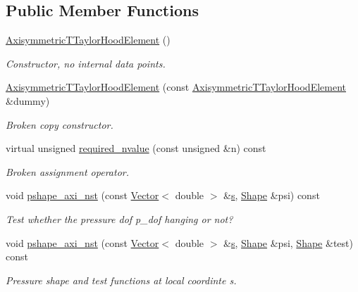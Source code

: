 \subsection*{Public Member Functions}
\begin{DoxyCompactItemize}
\item 
\hyperlink{classoomph_1_1AxisymmetricTTaylorHoodElement_a0c37daf4d618fad20746a0df0bc0d150}{Axisymmetric\+T\+Taylor\+Hood\+Element} ()
\begin{DoxyCompactList}\small\item\em Constructor, no internal data points. \end{DoxyCompactList}\item 
\hyperlink{classoomph_1_1AxisymmetricTTaylorHoodElement_a629d1c0d1397f3804f99f97119dd6289}{Axisymmetric\+T\+Taylor\+Hood\+Element} (const \hyperlink{classoomph_1_1AxisymmetricTTaylorHoodElement}{Axisymmetric\+T\+Taylor\+Hood\+Element} \&dummy)
\begin{DoxyCompactList}\small\item\em Broken copy constructor. \end{DoxyCompactList}\item 
virtual unsigned \hyperlink{classoomph_1_1AxisymmetricTTaylorHoodElement_a6a5dd6b252f98c37d896a3d6f35d3688}{required\+\_\+nvalue} (const unsigned \&n) const
\begin{DoxyCompactList}\small\item\em Broken assignment operator. \end{DoxyCompactList}\item 
void \hyperlink{classoomph_1_1AxisymmetricTTaylorHoodElement_a9a52e3c13681e0ad373b330a0934b7a1}{pshape\+\_\+axi\+\_\+nst} (const \hyperlink{classoomph_1_1Vector}{Vector}$<$ double $>$ \&\hyperlink{cfortran_8h_ab7123126e4885ef647dd9c6e3807a21c}{s}, \hyperlink{classoomph_1_1Shape}{Shape} \&psi) const
\begin{DoxyCompactList}\small\item\em Test whether the pressure dof p\+\_\+dof hanging or not? \end{DoxyCompactList}\item 
void \hyperlink{classoomph_1_1AxisymmetricTTaylorHoodElement_acaeacbb982949d5f9c6b3afec8b98de9}{pshape\+\_\+axi\+\_\+nst} (const \hyperlink{classoomph_1_1Vector}{Vector}$<$ double $>$ \&\hyperlink{cfortran_8h_ab7123126e4885ef647dd9c6e3807a21c}{s}, \hyperlink{classoomph_1_1Shape}{Shape} \&psi, \hyperlink{classoomph_1_1Shape}{Shape} \&test) const
\begin{DoxyCompactList}\small\item\em Pressure shape and test functions at local coordinte s. \end{DoxyCompactList}\item 

\end{DoxyCompactItemize}
